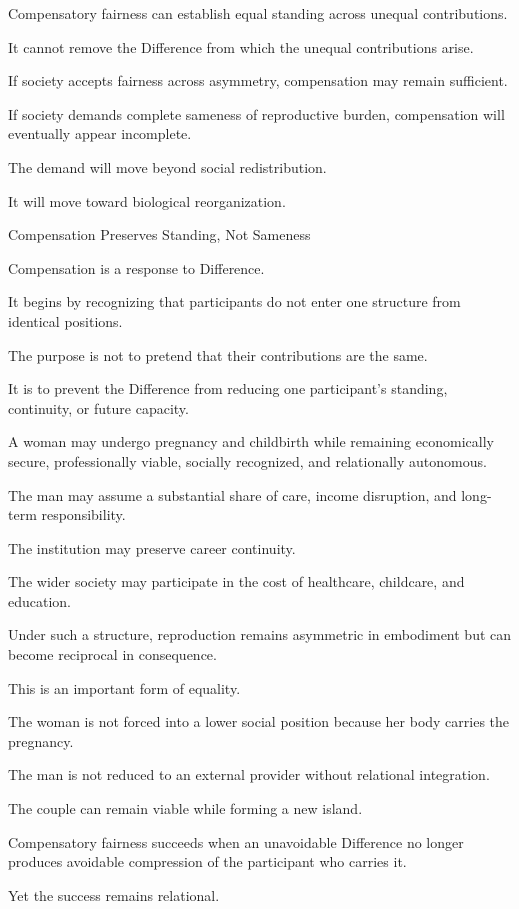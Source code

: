 Compensatory fairness can establish equal standing across unequal contributions.

It cannot remove the Difference from which the unequal contributions arise.

If society accepts fairness across asymmetry, compensation may remain sufficient.

If society demands complete sameness of reproductive burden, compensation will eventually appear incomplete.

The demand will move beyond social redistribution.

It will move toward biological reorganization.

Compensation Preserves Standing, Not Sameness

Compensation is a response to Difference.

It begins by recognizing that participants do not enter one structure from identical positions.

The purpose is not to pretend that their contributions are the same.

It is to prevent the Difference from reducing one participant’s standing, continuity, or future capacity.

A woman may undergo pregnancy and childbirth while remaining economically secure, professionally viable, socially recognized, and relationally autonomous.

The man may assume a substantial share of care, income disruption, and long-term responsibility.

The institution may preserve career continuity.

The wider society may participate in the cost of healthcare, childcare, and education.

Under such a structure, reproduction remains asymmetric in embodiment but can become reciprocal in consequence.

This is an important form of equality.

The woman is not forced into a lower social position because her body carries the pregnancy.

The man is not reduced to an external provider without relational integration.

The couple can remain viable while forming a new island.

Compensatory fairness succeeds when an unavoidable Difference no longer produces avoidable compression of the participant who carries it.

Yet the success remains relational.

